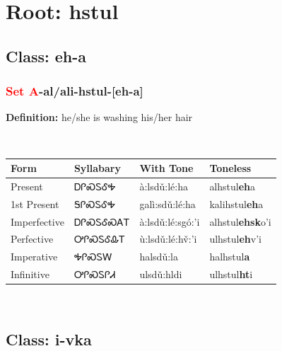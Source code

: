 \needspace{4in}
\section*{Root: hstul}
\nopagebreak
{}
\needspace{3in}
\subsection*{Class: eh-a}
\nopagebreak
\needspace{2in}
\subsubsection*{\textcolor{Red}{Set A}{-}al/ali{-}\textbf{hstul}{-}[eh-a]}
\nopagebreak
\textbf{Definition: } he/she is washing his/her hair
\\[0.5em]
\begin{tabularx}{\textwidth}{l X X X}%
\toprule%
\textbf{Form}&\textbf{Syllabary}&\textbf{With Tone}&\textbf{Toneless}\\%
\midrule%
Present&ᎠᎵᏍᏚᎴᎭ&à:lsdǔ:lé:ha&alhstul\textbf{eh}a\\%
1st Present&ᎦᎵᏍᏚᎴᎭ&galì:sdǔ:lé:ha&kalihstul\textbf{eh}a\\%
Imperfective&ᎠᎵᏍᏚᎴᏍᎪᎢ&à:lsdǔ:lé:sgó:’i&alhstul\textbf{ehsk}o'i\\%
Perfective&ᎤᎵᏍᏚᎴᎲᎢ&ù:lsdǔ:lé:hv̌:’i&ulhstul\textbf{eh}v'i\\%
Imperative&ᎭᎵᏍᏚᎳ&halsdǔ:la&halhstul\textbf{a}\\%
Infinitive&ᎤᎵᏍᏚᎵᏗ&ulsdǔ:hldi&ulhstul\textbf{ht}i\\%
\bottomrule%
\end{tabularx}
\\[1em]
\needspace{3in}
\subsection*{Class: i-vka}
\nopagebreak
\needspace{2in}
